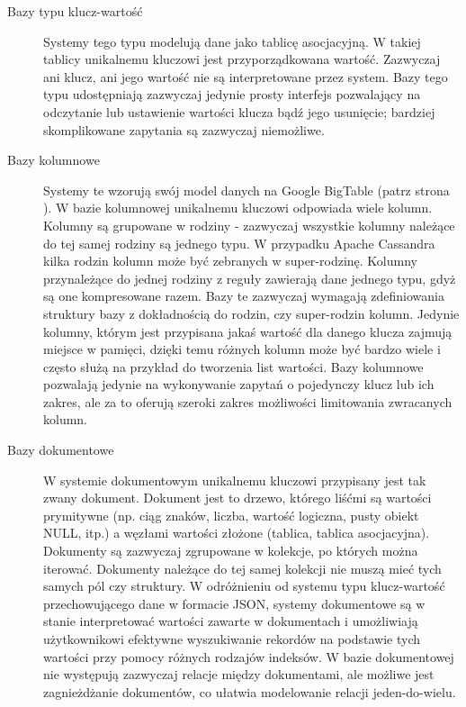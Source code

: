 \begin{description}
 \item[Bazy typu klucz-wartość]
 Systemy tego typu modelują dane jako tablicę asocjacyjną.
 W takiej tablicy unikalnemu kluczowi jest przyporządkowana wartość.
 Zazwyczaj ani klucz, ani jego wartość nie są interpretowane przez system.
 Bazy tego typu udostępniają zazwyczaj jedynie prosty interfejs pozwalający na odczytanie lub ustawienie wartości klucza bądź jego usunięcie; bardziej skomplikowane zapytania są zazwyczaj niemożliwe.
 
 \item[Bazy kolumnowe]
 Systemy te wzorują swój model danych na Google BigTable (patrz strona \pageref{google-bigtable-model-danych}).
 W bazie kolumnowej unikalnemu kluczowi odpowiada wiele kolumn.
 Kolumny są grupowane w rodziny - zazwyczaj wszystkie kolumny należące do tej samej rodziny są jednego typu.
 W przypadku Apache Cassandra kilka rodzin kolumn może być zebranych w super-rodzinę.
 Kolumny przynależące do jednej rodziny z reguły zawierają dane jednego typu, gdyż są one kompresowane razem.
 Bazy te zazwyczaj wymagają zdefiniowania struktury bazy z dokładnością do rodzin, czy super-rodzin kolumn.
 Jedynie kolumny, którym jest przypisana jakaś wartość dla danego klucza zajmują miejsce w pamięci, dzięki temu różnych kolumn może być bardzo wiele i często służą na przykład do tworzenia list wartości.
 Bazy kolumnowe pozwalają jedynie na wykonywanie zapytań o pojedynczy klucz lub ich zakres, ale za to oferują szeroki zakres możliwości limitowania zwracanych kolumn.

 \item[Bazy dokumentowe]
 W systemie dokumentowym unikalnemu kluczowi przypisany jest tak zwany dokument.
 Dokument jest to drzewo, którego liśćmi są wartości prymitywne (np. ciąg znaków, liczba, wartość logiczna, pusty obiekt NULL, itp.) a węzłami wartości złożone (tablica, tablica asocjacyjna).
 Dokumenty są zazwyczaj zgrupowane w kolekcje, po których można iterować.
 Dokumenty należące do tej samej kolekcji nie muszą mieć tych samych pól czy struktury.
 W odróżnieniu od systemu typu klucz-wartość przechowującego dane w formacie JSON, systemy dokumentowe są w stanie interpretować wartości zawarte w dokumentach i umożliwiają użytkownikowi efektywne wyszukiwanie rekordów na podstawie tych wartości przy pomocy różnych rodzajów indeksów.
 W bazie dokumentowej nie występują zazwyczaj relacje między dokumentami, ale możliwe jest zagnieżdżanie dokumentów, co ułatwia modelowanie relacji jeden-do-wielu.
 

\end{description}
